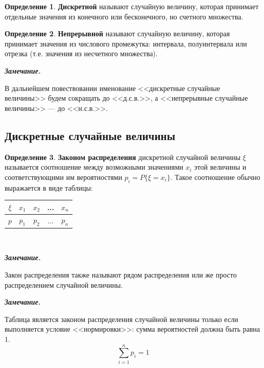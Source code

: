\documentclass[12pt,a4paper]{article}
\theoremstyle{definition}
\newtheorem{definition}{Определение}[section]
\theoremstyle{definition}
\theoremstyle{remark}
\newenvironment{remark}{
  \par\noindent\textbf{\textit{Замечание.}}~
}{\par}
\theoremstyle{corollary}
\newcommand{\nextblock}{\vspace{1.5em}\noindent}
\theoremstyle{bolditalic}
\begin{document}
\begin{definition}
    \textbf{Дискретной} называют случайную величину, которая принимает отдельные значения из конечного или бесконечного, но счетного множества.
\end{definition}

\begin{definition}
    \textbf{Непрерывной} называют случайную величину, которая принимает значения из числового промежутка: интервала, полуинтервала или отрезка (т.е. значения из несчетного множества).
\end{definition}

\begin{remark}
    В дальнейшем повествовании именование <<дискретные случайные величины>> будем сокращать до <<д.с.в.>>, а <<непрерывные случайные величины>> --- до <<н.с.в.>>.
\end{remark}

\subsection{Дискретные случайные величины}

\begin{definition}
    \textbf{Законом распределения} дискретной случайной величины $\xi$ называется соотношение между возможными значениями $x_i$ этой величины и соответствующими им вероятностями $p_i = P\{\xi=x_i\}$. Такое соотношение обычно выражается в виде таблицы:
    
    \centering
    \begin{tabular}{|c|c|c|c|c|}
    \hline
    $\xi$ & $x_1$ & $x_2$ & ... & $x_n$ \\
    \hline
    $p$ & $p_1$ & $p_2$ & ... & $p_n$ \\
    \hline
    \end{tabular}
\\
 
\end{definition}

\begin{remark}
    Закон распределения также называют рядом распределения или же просто распределением случайной величины.
\end{remark}

\nextblock

\begin{remark}
    Таблица является законом распределения случайной величины только если выполняется условие <<нормировки>>: сумма вероятностей должна быть равна 1. 
    \[
    \sum_{i=1}^{n}{p_i}=1
    \]
\end{remark}
\end{document}
